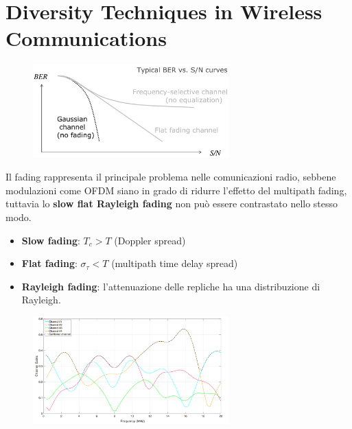 \section*{Diversity Techniques in Wireless Communications}



\begin{figure}[ht]
    \centering
    \includegraphics[width=0.675\textwidth]{imgs/bers.png}
\end{figure}


Il fading rappresenta il principale problema nelle comunicazioni radio, sebbene modulazioni come OFDM siano in grado di ridurre l'effetto del multipath fading, tuttavia lo \textbf{slow flat Rayleigh fading} non può essere contrastato nello stesso modo.

\begin{itemize}
    \item \textbf{Slow fading}: $T_c > T$ (Doppler spread)
    \item \textbf{Flat fading}: $\sigma_{\tau}<T$  (multipath time delay spread)
    \item \textbf{Rayleigh fading}: l'attenuazione delle repliche ha una distribuzione di Rayleigh.
\end{itemize}

\begin{figure}[ht]
    \centering
    \includegraphics[width=0.675\textwidth]{imgs/diversity_graph.jpg}
\end{figure}


